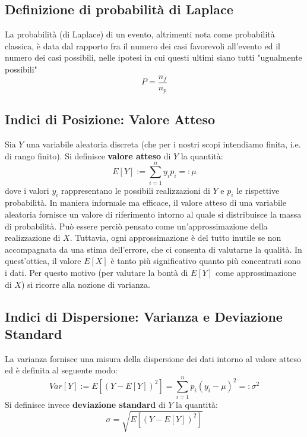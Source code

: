 \subsection{Definizione di probabilità di Laplace}
La probabilità (di Laplace) di un evento, altrimenti nota come probabilità classica, è data dal rapporto fra il numero dei casi favorevoli all'evento ed il numero dei casi possibili, nelle ipotesi in cui questi ultimi siano tutti "ugualmente possibili"
\begin{equation}
	P=\frac{n_f}{n_p}
\end{equation}

\subsection{Indici di Posizione: Valore Atteso}
Sia $Y$ una variabile aleatoria discreta (che per i nostri scopi intendiamo finita, i.e. di rango finito). Si definisce \textbf{valore atteso} di $Y$ la quantità:
\begin{equation}
    E[Y] := \sum_{i=1}^{n} y_i p_i =: \mu
\end{equation}
dove i valori $y_i$ rappresentano le possibili realizzazioni di $Y$ e $p_i$ le rispettive probabilità. In maniera informale ma efficace, il valore atteso di una variabile aleatoria fornisce un valore di riferimento intorno al quale si distribuisce la massa di probabilità. Può essere perciò pensato come un'approssimazione della realizzazione di $X$. Tuttavia, ogni approssimazione è del tutto inutile se non accompagnata da una stima dell'errore, che ci consenta di valutarne la qualità. In quest'ottica, il valore $E[X]$ è tanto più significativo quanto più concentrati sono i dati. Per questo motivo (per valutare la bontà di $E[Y]$ come approssimazione di $X$) si ricorre alla nozione di varianza.
\subsection{Indici di Dispersione: Varianza e Deviazione Standard}
La varianza fornisce una misura della dispersione dei dati intorno al valore atteso ed è definita al seguente modo:
\begin{equation}
    Var[Y] := E[(Y-E[Y])^2]= \sum_{i=1}^{n}p_i(y_i - \mu)^2 =: \sigma^2
\end{equation}
Si definisce invece \textbf{deviazione standard} di $Y$ la quantità:
\begin{equation}
    \sigma = \sqrt{E[(Y-E[Y])^2]}
\end{equation}


